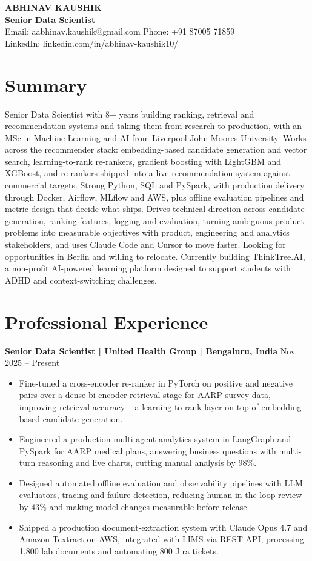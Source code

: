 \documentclass[10pt,a4paper]{article}
\newcommand{\role}[2]{\textbf{#1} \hfill #2\par}
\begin{document}
\begin{center}
  {\Large\bfseries ABHINAV KAUSHIK}\\[1pt]
  \textbf{Senior Data Scientist}\\[1pt]
  Email: aabhinav.kaushik@gmail.com \quad Phone: +91 87005 71859\\
  LinkedIn: linkedin.com/in/abhinav-kaushik10/
\end{center}

\section{Summary}
Senior Data Scientist with 8+ years building ranking, retrieval and recommendation systems and taking them from
research to production, with an MSc in Machine Learning and AI from Liverpool John Moores University. Works across
the recommender stack: embedding-based candidate generation and vector search, learning-to-rank re-rankers,
gradient boosting with LightGBM and XGBoost, and re-rankers shipped into a live recommendation system against
commercial targets. Strong Python, SQL and PySpark, with production delivery through Docker, Airflow, MLflow and
AWS, plus offline evaluation pipelines and metric design that decide what ships. Drives technical direction across
candidate generation, ranking features, logging and evaluation, turning ambiguous product problems into measurable
objectives with product, engineering and analytics stakeholders, and uses Claude Code and Cursor to move faster.
Looking for opportunities in Berlin and willing to relocate. Currently building ThinkTree.AI, a non-profit
AI-powered learning platform designed to support students with ADHD and context-switching challenges.

\section{Professional Experience}
\role{Senior Data Scientist | United Health Group | Bengaluru, India}{Nov 2025 -- Present}
\begin{itemize}
  \item Fine-tuned a cross-encoder re-ranker in PyTorch on positive and negative pairs over a dense bi-encoder
  retrieval stage for AARP survey data, improving retrieval accuracy -- a learning-to-rank layer on top of
  embedding-based candidate generation.
  \item Engineered a production multi-agent analytics system in LangGraph and PySpark for AARP medical plans,
  answering business questions with multi-turn reasoning and live charts, cutting manual analysis by 98\%.
  \item Designed automated offline evaluation and observability pipelines with LLM evaluators, tracing and failure
  detection, reducing human-in-the-loop review by 43\% and making model changes measurable before release.
  \item Shipped a production document-extraction system with Claude Opus 4.7 and Amazon Textract on AWS, integrated
  with LIMS via REST API, processing 1,800 lab documents and automating 800 Jira tickets.
\end{itemize}
\vspace{3pt}
\end{document}
